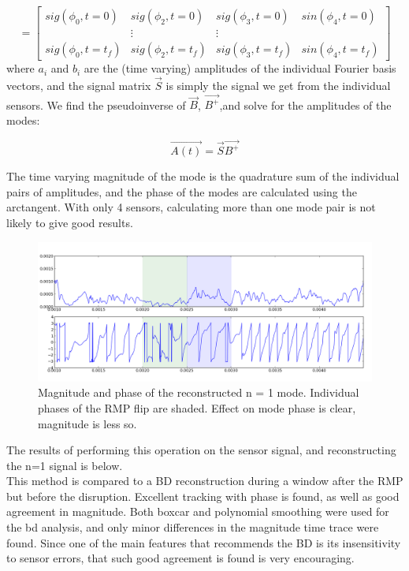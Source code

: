 \documentclass{article}
\begin{document}
$$ = \begin{bmatrix}
sig(\phi_0,t=0) & sig(\phi_2,t =0) &sig(\phi_3, t =0) & sin(\phi_4, t = 0)\\
& \vdots & \vdots & \\
sig(\phi_0,t=t_f) & sig(\phi_2,t =t_f) &sig(\phi_3, t =t_f) & sin(\phi_4, t = t_f)
\end{bmatrix}$$
where $a_i$ and $b_i$ are the (time varying) amplitudes of the individual Fourier basis vectors, and the signal matrix $\overrightarrow{S}$ is simply the signal we get from the individual sensors.  We find the pseudoinverse of $\overrightarrow{B}$, $\overrightarrow{B^+}$,and solve for the amplitudes of the modes:

$$\overrightarrow{A(t)} = \overrightarrow{S}\overrightarrow{B^+}$$

The time varying magnitude of the mode is the quadrature sum of the individual pairs of amplitudes, and the phase of the modes are calculated using the arctangent.  With only 4 sensors, calculating more than one mode pair is not likely to give good results.\par
\begin{figure}[h]
\includegraphics[width = \textwidth]{./Report_pic_n1_sig.png}\caption{Magnitude and phase of the reconstructed n = 1 mode.  Individual phases of the RMP flip are shaded.  Effect on mode phase is clear, magnitude is less so.}
\label{poly_sig}
\end{figure}
The results of performing this operation on the sensor signal, and reconstructing the n=1 signal is below.\\
This method is compared to a BD reconstruction during a window after the RMP but before the disruption.  Excellent tracking with phase is found, as well as good agreement in magnitude.  Both boxcar and polynomial smoothing were used for the bd analysis, and only minor differences in the magnitude time trace were found.  Since one of the main features that recommends the BD is its insensitivity to sensor errors, that such good agreement is found is very encouraging.
\end{document}
